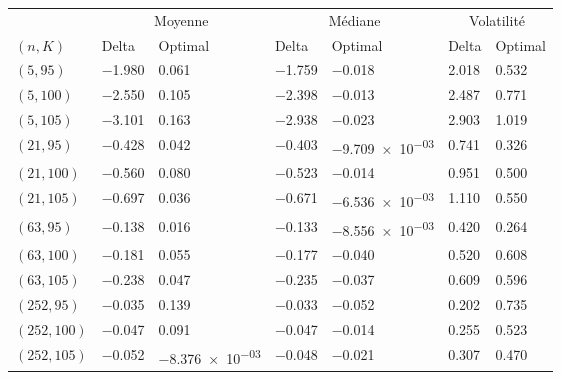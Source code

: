 \begin{tabular}{lllllll}
\toprule
& \multicolumn{2}{c}{Moyenne} & \multicolumn{2}{c}{Médiane} & \multicolumn{2}{c}{Volatilité}\\
$(n,K)$& Delta & Optimal & Delta & Optimal & Delta & Optimal\\
\midrule
$(5,95)$ & \num{-1.980} & \num{0.061} & \num{-1.759} & \num{-0.018} & \num{2.018} & \num{0.532}\\
$(5,100)$ & \num{-2.550} & \num{0.105} & \num{-2.398} & \num{-0.013} & \num{2.487} & \num{0.771}\\
$(5,105)$ & \num{-3.101} & \num{0.163} & \num{-2.938} & \num{-0.023} & \num{2.903} & \num{1.019}\\
$(21,95)$ & \num{-0.428} & \num{0.042} & \num{-0.403} & \num{-9.709e-03} & \num{0.741} & \num{0.326}\\
$(21,100)$ & \num{-0.560} & \num{0.080} & \num{-0.523} & \num{-0.014} & \num{0.951} & \num{0.500}\\
$(21,105)$ & \num{-0.697} & \num{0.036} & \num{-0.671} & \num{-6.536e-03} & \num{1.110} & \num{0.550}\\
$(63,95)$ & \num{-0.138} & \num{0.016} & \num{-0.133} & \num{-8.556e-03} & \num{0.420} & \num{0.264}\\
$(63,100)$ & \num{-0.181} & \num{0.055} & \num{-0.177} & \num{-0.040} & \num{0.520} & \num{0.608}\\
$(63,105)$ & \num{-0.238} & \num{0.047} & \num{-0.235} & \num{-0.037} & \num{0.609} & \num{0.596}\\
$(252,95)$ & \num{-0.035} & \num{0.139} & \num{-0.033} & \num{-0.052} & \num{0.202} & \num{0.735}\\
$(252,100)$ & \num{-0.047} & \num{0.091} & \num{-0.047} & \num{-0.014} & \num{0.255} & \num{0.523}\\
$(252,105)$ & \num{-0.052} & \num{-8.376e-03} & \num{-0.048} & \num{-0.021} & \num{0.307} & \num{0.470}\\
\bottomrule
\end{tabular}
\\[3em]
